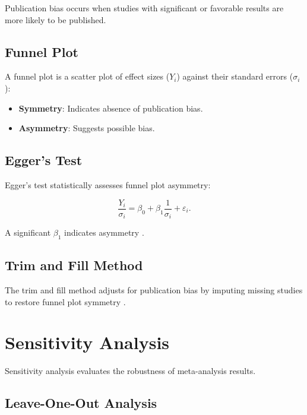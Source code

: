 \documentclass[12pt,a4paper]{report}
\begin{document}
Publication bias occurs when studies with significant or favorable results are more likely to be published.

\subsection{Funnel Plot}
\label{subsec:funnel_plot}

A funnel plot is a scatter plot of effect sizes ($Y_i$) against their standard errors ($\sigma_i$):

\begin{itemize}
    \item \textbf{Symmetry}: Indicates absence of publication bias.
    \item \textbf{Asymmetry}: Suggests possible bias.
\end{itemize}

\subsection{Egger's Test}
\label{subsec:eggers_test}

Egger's test statistically assesses funnel plot asymmetry:

\begin{equation}
\label{eq:eggers_test}
\frac{Y_i}{\sigma_i} = \beta_0 + \beta_1 \frac{1}{\sigma_i} + \varepsilon_i.
\end{equation}

A significant $\beta_1$ indicates asymmetry \citep{egger1997}.

\subsection{Trim and Fill Method}
\label{subsec:trim_and_fill}

The trim and fill method adjusts for publication bias by imputing missing studies to restore funnel plot symmetry \citep{duval2000}.

\section{Sensitivity Analysis}
\label{sec:sensitivity_analysis}

Sensitivity analysis evaluates the robustness of meta-analysis results.

\subsection{Leave-One-Out Analysis}
\label{subsec:leave_one_out}
\end{document}
